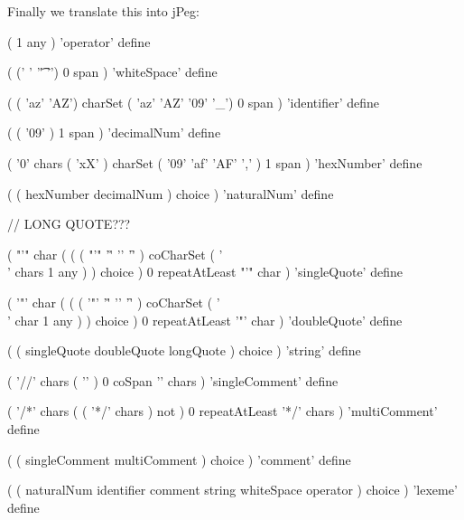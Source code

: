 Finally we translate this into jPeg:

\starttyping
( 1 any ) 'operator' define

(
  (' ' '\t' '\n') 0 span
) 'whiteSpace' define

(
  ( 'az' 'AZ') charSet
  ( 'az' 'AZ' '09' '_') 0 span
) 'identifier' define

(
  ( '09' ) 1 span
) 'decimalNum' define

(
  '0' chars
  ( 'xX' ) charSet
  ( '09' 'af' 'AF' ',' ) 1 span
) 'hexNumber' define

(
  ( hexNumber decimalNum ) choice
) 'naturalNum' define

// LONG QUOTE???

(
  "'" char
  ( 
    (
      ( "'" '\r' '\n' '\f' ) coCharSet
      ( '\\' chars 1 any )
    ) choice
  ) 0 repeatAtLeast
  "'" char
) 'singleQuote' define

(
  '"' char
  ( 
    (
      ( '"' '\r' '\n' '\f' ) coCharSet
      ( '\\' char 1 any )
    ) choice
  ) 0 repeatAtLeast
  '"' char
) 'doubleQuote' define

(
  ( singleQuote doubleQuote longQuote ) choice
) 'string' define

(
  '//' chars
  ( '\n' ) 0 coSpan
  '\n' chars
) 'singleComment' define

(
  '/*' chars
  ( ( '*/' chars ) not ) 0 repeatAtLeast
  '*/' chars
) 'multiComment' define

(
  ( singleComment multiComment ) choice
) 'comment' define

(
  (
    naturalNum
    identifier
    comment
    string
    whiteSpace
    operator
  ) choice
) 'lexeme' define
\stoptyping

\startCHeader

\stopCHeader

\startCCode

\stopCCode

